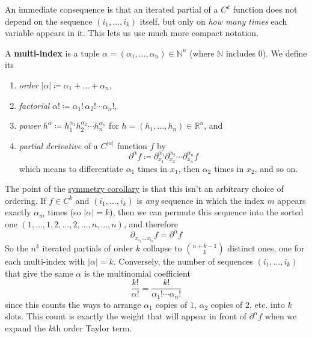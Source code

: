   An immediate consequence is that an iterated partial of a $C^k$ function does not depend on the sequence $(i_1, \ldots, i_k)$ itself, but only on \textit{how many times} each variable appears in it. This lets us use much more compact notation.

  \begin{definition}
    \label{def:multi-index}
    A \textbf{multi-index} is a tuple $\alpha = (\alpha_1, \ldots, \alpha_n) \in \mathbb{N}^n$ (where $\mathbb{N}$ includes $0$). We define its
    \begin{enumerate}
      \item \textit{order} $|\alpha| \coloneqq \alpha_1 + \ldots + \alpha_n$,
      \item \textit{factorial} $\alpha! \coloneqq \alpha_1! \, \alpha_2! \cdots \alpha_n!$,
      \item \textit{power} $h^\alpha \coloneqq h_1^{\alpha_1} h_2^{\alpha_2} \cdots h_n^{\alpha_n}$ for $h = (h_1, \ldots, h_n) \in \mathbb{R}^n$, and
      \item \textit{partial derivative} of a $C^{|\alpha|}$ function $f$ by
      \begin{equation}
        \partial^\alpha f \coloneqq \partial_{x_1}^{\alpha_1} \partial_{x_2}^{\alpha_2} \cdots \partial_{x_n}^{\alpha_n} f
      \end{equation}
      which means to differentiate $\alpha_1$ times in $x_1$, then $\alpha_2$ times in $x_2$, and so on.
    \end{enumerate}
  \end{definition}

  The point of the \hyperref[thm:symmetry-in-kth-iterated-partials]{symmetry corollary} is that this isn't an arbitrary choice of ordering. If $f \in C^k$ and $(i_1, \ldots, i_k)$ is \textit{any} sequence in which the index $m$ appears exactly $\alpha_m$ times (so $|\alpha| = k$), then we can permute this sequence into the sorted one $(1, \ldots, 1, 2, \ldots, 2, \ldots, n, \ldots, n)$, and therefore
  \begin{equation}
    \partial_{x_{i_1} \ldots x_{i_k}} f = \partial^\alpha f
  \end{equation}
  So the $n^k$ iterated partials of order $k$ collapse to $\binom{n + k - 1}{k}$ distinct ones, one for each multi-index with $|\alpha| = k$. Conversely, the number of sequences $(i_1, \ldots, i_k)$ that give the same $\alpha$ is the multinomial coefficient
  \begin{equation}
    \frac{k!}{\alpha!} = \frac{k!}{\alpha_1! \cdots \alpha_n!}
  \end{equation}
  since this counts the ways to arrange $\alpha_1$ copies of $1$, $\alpha_2$ copies of $2$, etc. into $k$ slots. This count is exactly the weight that will appear in front of $\partial^\alpha f$ when we expand the $k$th order Taylor term.

